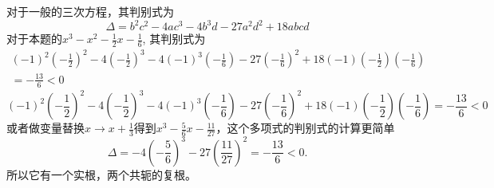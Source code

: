 对于一般的三次方程，其判别式为
$$\Delta = b^{2}c^{2}-4ac^{3}-4b^{3}d-27a^{2}d^{2}+18abcd$$
对于本题的$x^3 - x^2 - \frac{1}{2}x - \frac{1}{6}$, 其判别式为
\ifLargeLayout
\begin{multline*}
(-1)^2(-\frac{1}{2})^2 - 4(-\frac{1}{2})^3 - 4(-1)^3(-\frac{1}{6}) - 27(-\frac{1}{6})^2 + 18(-1)(-\frac{1}{2})(-\frac{1}{6}) \\
= -\frac{13}{6} < 0
\end{multline*}
\else
$$(-1)^2(-\frac{1}{2})^2 - 4(-\frac{1}{2})^3 - 4(-1)^3(-\frac{1}{6}) - 27(-\frac{1}{6})^2 + 18(-1)(-\frac{1}{2})(-\frac{1}{6}) = -\frac{13}{6} < 0$$
\fi  %
或者做变量替换$x\to x+\frac{1}{3}$得到$x^{3} - \frac{5}{6}x - \frac{11}{27}$，这个多项式的判别式的计算更简单
$$\Delta = -4(-\frac{5}{6})^3 - 27 (\frac{11}{27})^2 = -\frac{13}{6} < 0.$$
所以它有一个实根，两个共轭的复根。

\fi  %








